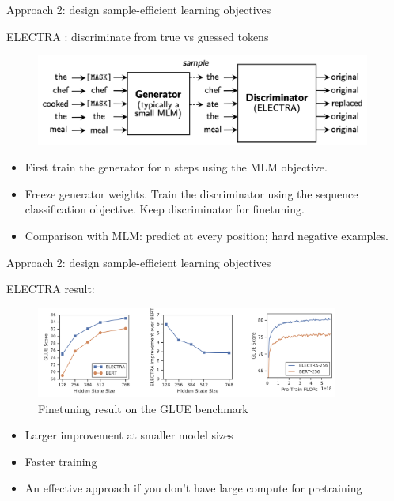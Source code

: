 \documentclass[usenames,dvipsnames,notes,11pt,aspectratio=169,hyperref={colorlinks=true, linkcolor=blue}]{beamer}
\begin{document}
\begin{frame}
    {Approach 2: design sample-efficient learning objectives}

    ELECTRA : discriminate from true vs guessed tokens

    \vspace{-1em}
    \begin{figure}
        \includegraphics[height=3cm]{figures/electra}
    \end{figure}
    \vspace{-1em}

    \begin{itemize}
        \item First train the generator for n steps using the MLM objective.
        \item Freeze generator weights. Train the discriminator using the sequence classification objective. Keep discriminator for finetuning.
        \item Comparison with MLM: predict at every position; hard negative examples. 
    \end{itemize}
\end{frame}

\begin{frame}
    {Approach 2: design sample-efficient learning objectives}

    ELECTRA result:
    \begin{figure}
        \includegraphics[height=3cm]{figures/electra-result}
        \caption{Finetuning result on the GLUE benchmark}
    \end{figure}
    \begin{itemize}
        \item Larger improvement at smaller model sizes
        \item Faster training 
        \item An effective approach if you don't have large compute for pretraining
    \end{itemize}
\end{frame}
\end{document}
